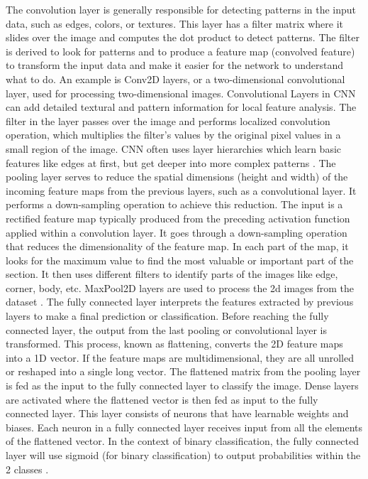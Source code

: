\documentclass[10pt,twocolumn]{article}
\begin{document}
\newline
The convolution layer is generally responsible for detecting patterns in the input data, such as edges, colors, or textures. This layer has a filter matrix where it slides over the image and computes the dot product to detect patterns. The filter is derived to look for patterns and to produce a feature map (convolved feature) to transform the input data and make it easier for the network to understand what to do. An example is Conv2D layers, or a two-dimensional convolutional layer, used for processing two-dimensional images. Convolutional Layers in CNN can add detailed textural and pattern information for local feature analysis. The filter in the layer passes over the image and performs localized convolution operation, which multiplies the filter’s values by the original pixel values in a small region of the image. CNN often uses layer hierarchies which learn basic features like edges at first, but get deeper into more complex patterns \cite{Mishra_2020}. 
\newline
\newline
The pooling layer serves to reduce the spatial dimensions (height and width) of the incoming feature maps from the previous layers, such as a convolutional layer. It performs a down-sampling operation to achieve this reduction. The input is a rectified feature map typically produced from the preceding activation function applied within a convolution layer. It goes through a down-sampling operation that reduces the dimensionality of the feature map. In each part of the map, it looks for the maximum value to find the most valuable or important part of the section. It then uses different filters to identify parts of the images like edge, corner, body, etc. MaxPool2D layers are used to process the 2d images from the dataset \cite{Mishra_2020}. 
\newline
\newline
The fully connected layer interprets the features extracted by previous layers to make a final prediction or classification. Before reaching the fully connected layer, the output from the last pooling or convolutional layer is transformed. This process, known as flattening, converts the 2D feature maps into a 1D vector. If the feature maps are multidimensional, they are all unrolled or reshaped into a single long vector. The flattened matrix from the pooling layer is fed as the input to the fully connected layer to classify the image. Dense layers are activated where the flattened vector is then fed as input to the fully connected layer. This layer consists of neurons that have learnable weights and biases. Each neuron in a fully connected layer receives input from all the elements of the flattened vector. In the context of binary classification, the fully connected layer will use sigmoid (for binary classification) to output probabilities within the 2 classes \cite{Mishra_2020}.
\end{document}
